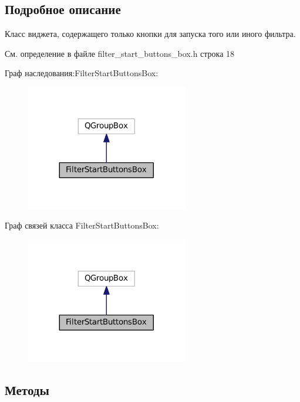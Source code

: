 \subsection{Подробное описание}
Класс виджета, содержащего только кнопки для запуска того или иного фильтра. 

См. определение в файле filter\+\_\+start\+\_\+buttons\+\_\+box.\+h строка 18



Граф наследования\+:Filter\+Start\+Buttons\+Box\+:\nopagebreak
\begin{figure}[H]
\begin{center}
\leavevmode
\includegraphics[width=200pt]{class_filter_start_buttons_box__inherit__graph}
\end{center}
\end{figure}


Граф связей класса Filter\+Start\+Buttons\+Box\+:\nopagebreak
\begin{figure}[H]
\begin{center}
\leavevmode
\includegraphics[width=200pt]{class_filter_start_buttons_box__coll__graph}
\end{center}
\end{figure}


\subsection{Методы}
\hypertarget{class_filter_start_buttons_box_ae3a208f9857ce99c02506e4005f71a60}{}\label{class_filter_start_buttons_box_ae3a208f9857ce99c02506e4005f71a60} 
